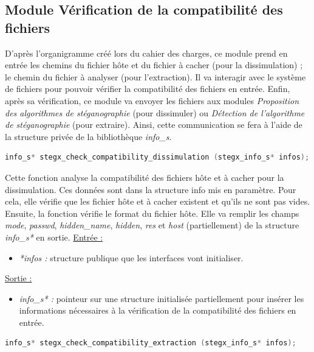 \documentclass[11pt]{article}
\begin{document}
\subsection{Module Vérification de la compatibilité des fichiers}

D'après l'organigramme créé lors du cahier des charges, ce module prend en 
entrée les chemins du fichier hôte et du fichier à cacher (pour la dissimulation) ; 
le chemin du fichier à analyser (pour l'extraction). Il va interagir avec 
le système de fichiers pour pouvoir vérifier la compatibilité des fichiers en entrée. 
Enfin, après sa vérification, ce module va envoyer les fichiers aux modules 
\textit{Proposition des algorithmes de stéganographie} (pour dissimuler) ou 
\textit{Détection de l'algorithme de stéganographie} (pour extraire). 
Ainsi, cette communication se fera à l'aide de la structure privée de la 
bibliothèque \textit{info\_s}. 
\newline

\begin{lstlisting}[language=c]
info_s* stegx_check_compatibility_dissimulation (stegx_info_s* infos);
\end{lstlisting}

Cette fonction analyse la compatibilité des fichiers hôte et à cacher pour
la dissimulation. Ces données sont dans la structure info mis en paramètre. 
Pour cela, elle vérifie que les fichier hôte et à cacher existent et qu'ils 
ne sont pas vides. Ensuite, la fonction vérifie le format du fichier hôte. 
Elle va remplir les champs \textit{mode}, \textit{passwd}, \textit{hidden\_name}, \textit{hidden},
\textit{res} et \textit{host} (partiellement) de la structure
\textit{info\_s*} en sortie. 
\newline
\underline{Entrée :}
\begin{itemize}
\item \textit{*infos :} structure publique que les interfaces vont initialiser.
\end{itemize}
\underline{Sortie :}
\begin{itemize}
\item \textit{info\_s* :} pointeur sur une structure initialisée 
partiellement pour insérer les informations nécessaires à la vérification 
de la compatibilité des fichiers en entrée. 
\newline 
\end{itemize}

\begin{lstlisting}[language=c]
info_s* stegx_check_compatibility_extraction (stegx_info_s* infos);
\end{lstlisting}
\end{document}
